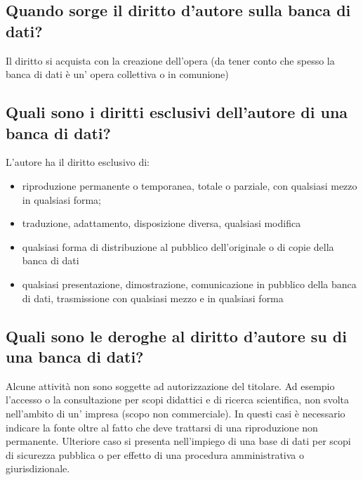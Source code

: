 \subsection{Quando sorge il diritto d'autore sulla banca di dati?}
Il diritto si acquista con la creazione dell'opera (da tener conto che
spesso la banca di dati è un' opera collettiva o in comunione)

\subsection{Quali sono i diritti esclusivi dell'autore di una banca di dati?}
L'autore ha il diritto esclusivo di:
\begin{itemize}
    \item riproduzione permanente o temporanea, totale o parziale, con qualsiasi mezzo in qualsiasi forma;
    \item traduzione, adattamento, disposizione diversa, qualsiasi modifica
    \item qualsiasi forma di distribuzione al pubblico dell'originale o di copie della banca di dati
    \item qualsiasi presentazione, dimostrazione, comunicazione in pubblico della banca di dati, trasmissione con qualsiasi
    mezzo e in qualsiasi forma
\end{itemize}

\subsection{Quali sono le deroghe al diritto d'autore su di una banca di dati?}
Alcune attività non sono soggette ad autorizzazione del titolare. Ad esempio l'accesso o la consultazione
per scopi didattici e di ricerca scientifica, non svolta nell'ambito di un' impresa (scopo non commerciale).
In questi casi è necessario indicare la fonte oltre al fatto che deve trattarsi di una riproduzione non permanente.\newline
Ulteriore caso si presenta nell'impiego di una base di dati per scopi di sicurezza pubblica o per effetto di una
procedura amministrativa o giurisdizionale.


